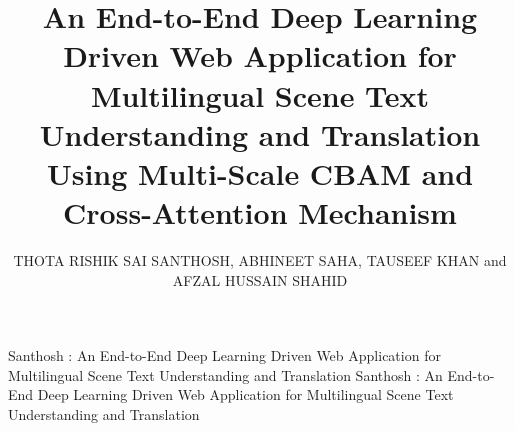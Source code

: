 \documentclass{ieeeaccess}
\begin{document}
\history{}
\doi{}

\title{An End-to-End Deep Learning Driven Web Application for Multilingual Scene Text Understanding and Translation Using Multi-Scale CBAM and Cross-Attention Mechanism}

\author{%
  \uppercase{Thota Rishik Sai Santhosh},
  \uppercase{Abhineet Saha},
  \uppercase{Tauseef Khan} and
  \uppercase{AFZAL HUSSAIN SHAHID}%
}

\address[1]{School of Computer Science and Engineering (SCOPE),
VIT-AP University, Beside AP Secretariat, Amaravati, 522241, Andhra Pradesh, India}
\address[2]{Department of Software and System Engineering, School of Computer Science and Engineering (SCOPE),
VIT-AP University, Beside AP Secretariat, Amaravati, 522241, Andhra Pradesh, India}
\address[3]{Department of Artificial Intelligence and Machine Learning, School of Computer Science and Engineering (SCOPE),
VIT-AP University, Beside AP Secretariat, Amaravati, 522241, Andhra Pradesh, India}

\markboth
{Santhosh \headeretal: An End-to-End Deep Learning Driven Web Application for Multilingual Scene Text Understanding and Translation}
{Santhosh \headeretal: An End-to-End Deep Learning Driven Web Application for Multilingual Scene Text Understanding and Translation}

\end{document}
